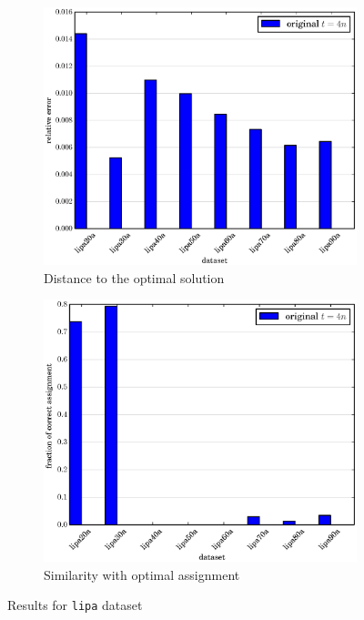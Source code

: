 \documentclass[english,a4paper,twoside]{ppfcmthesis}
\begin{document}
\begin{figure}
  \centering

  \begin{subfigure}{0.47\textwidth}
    \includegraphics[width=1.0\textwidth]{algorithm/metaheuristic/charts/complipaoriginal/distance.eps}
    \caption{Distance to the optimal solution}
  \end{subfigure}
  \begin{subfigure}{0.47\textwidth}
    \includegraphics[width=1.0\textwidth]{algorithm/metaheuristic/charts/complipaoriginal/similarity.eps}
    \caption{Similarity with optimal assignment}
  \end{subfigure}

  \caption{Results for \texttt{lipa} dataset}
  \label{figure:am_lipa_results}
\end{figure}
\end{document}
